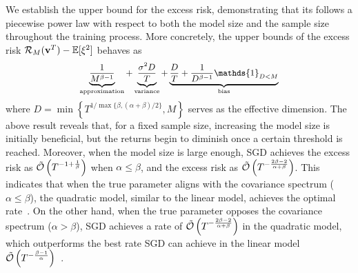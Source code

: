 We establish the upper bound for the excess risk, demonstrating that its follows a piecewise 
power law with respect to both the model size and the sample size throughout the training process. More concretely, the upper bounds of the excess risk $\mathcal{R}_M(\mathbf{v}^T)-\mathbb{E}[\xi^2]$ behaves as 
\begin{equation}\nonumber
\small
\begin{aligned}
    \underbrace{\frac{1}{M^{\beta-1}}}_{\mathrm{approximation}}+\underbrace{\frac{\sigma^2D}{T}}_{\mathrm{variance}}+\underbrace{\frac{D}{T}+\frac{1}{D^{\beta-1}}\mathds{1}_{D<M}}_{\mathrm{bias}}
\end{aligned}
\end{equation}
where $D=\min\left\{T^{1/\max\{\beta,(\alpha+\beta)/2\}},M\right\}$ serves as the effective dimension. 
The above result
reveals that, for a fixed sample size, increasing the model
size is initially beneficial, but the returns begin to diminish
once a certain threshold is reached. Moreover, when the model size is large enough, SGD achieves the excess risk as $\Tilde{\mathcal{O}} \left ( T^{-1+\frac{1}{\beta} } \right ) $ when $\alpha\le \beta$, and the excess risk as $\Tilde{\mathcal{O}} \left ( T^{-\frac{2\beta-2}{\alpha+\beta} } \right ) $.
This indicates that when the true parameter aligns with the covariance spectrum ($\alpha \le \beta$), the quadratic model, similar to the linear model, achieves the optimal rate~\citep{zhang2024optimality}.  On the other hand, when the true parameter opposes the covariance spectrum ($\alpha > \beta$), SGD achieves a rate of $\Tilde{\mathcal{O}} \left( T^{-\frac{2\beta - 2}{\alpha + \beta}} \right)$ in the quadratic model, which outperforms the best rate SGD can achieve in the linear model $\Tilde{\mathcal{O}} \left( T^{-\frac{\beta - 1}{\alpha}} \right)$~\citep{zhang2024optimality}.


 

